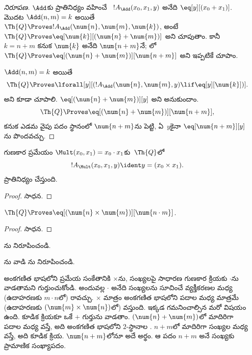 \documentclass[../../../include/open-logic-section]{subfiles}
\begin{document}
\begin{proof}[ నిరూపణ]
$\Add$కు ప్రాతినిధ్యం వహించే ~$!A_\Add(x_0,x_1,y)$ అనేది
$\eq[y][(x_0+x_1)]$. మొదట $\Add(n,m)=k$ అయితే
$\Th{Q}\Proves !A_\Add(\num{n},\num{m},\num{k})$, అంటే
$\Th{Q}\Proves\eq[\num{k}][(\num{n}+\num{m})]$ అని చూపుతాం. కానీ
$k=n+m$ కనుక $\num{k}$ అనేది $\num{n+m}$నే; లో
$\Th{Q}\Proves\eq[(\num{n}+\num{m})][\num{n+m}]$ అని ఇప్పటికే చూపాం.

$\Add(n,m)=k$ అయితే
\[
\Th{Q} \Proves \lforall[y][(!A_\Add(\num{n}, \num{m}, y) \lif
  \eq[y][\num{k}])].
\]
అని కూడా చూపాలి. $\eq[(\num{n}+\num{m})][y]$ అని అనుకుందాం.
\[
\Th{Q} \Proves \eq[(\num{n}+\num{m})][\num{n+m}],
\]
కనుక ఎడమ వైపు పదం స్థానంలో $\num{n+m}$ను పెట్టి, ఏ~$y$కైనా
$\eq[\num{n+m}][y]$ను పొందవచ్చు.
\end{proof}

\begin{prop}
గుణకార ప్రమేయం $\Mult(x_0,x_1)=x_0\cdot x_1$కు~$\Th{Q}$లో
\[
  !A_{\Mult}(x_0, x_1, y) \ident y = (x_0 \times x_1).
\]
ప్రాతినిధ్యం చేస్తుంది.
\end{prop}

\begin{proof} సాధన. \end{proof}

\begin{lem}
$\Th{Q} \Proves \eq[(\num{n} \times \num{m})][\num{n \cdot m}]$.
\end{lem}

\begin{proof} సాధన. \end{proof}

\begin{prob}
ను నిరూపించండి.
\end{prob}

\begin{prob}
ను వాడి
ను నిరూపించండి.
\end{prob}

\begin{explain}
  అంకగణిత భాషలోని ప్రమేయ సంకేతానికి $\times$ను, సంఖ్యలపై సాధారణ గుణకార
  క్రియకు $\cdot$ను వాడతామని గుర్తుంచుకోండి. అందువల్ల $\cdot$ అనేది సంఖ్యలను
సూచించే వ్యక్తీకరణల మధ్య (ఉదాహరణకు $m\cdot n$లో) రావచ్చు. $\times$ మాత్రం
  అంకగణిత భాషలోని పదాల మధ్య మాత్రమే (ఉదాహరణకు
$(\num{m}\times\num{n})$లో) వస్తుంది. ఇక్కడ గమనించాల్సిన మరో విషయం ఉంది.
   కూడిక క్రియకూ ఒకే $+$ గుర్తును వాడతాం.
  $(\num{n}+\num{m})$లో మాదిరిగా పదాల మధ్య వస్తే, అది అంకగణిత భాషలోని
  $2$-స్థానాల . $n+m$లో మాదిరిగా సంఖ్యల
మధ్య వస్తే, అది కూడిక క్రియ. $\num{n+m}$లోనూ అదే అర్థం.
  ఆ పదం $n+m$ అనే సంఖ్యకు ప్రామాణిక సంఖ్యాపదం.
\end{explain}
\end{document}

